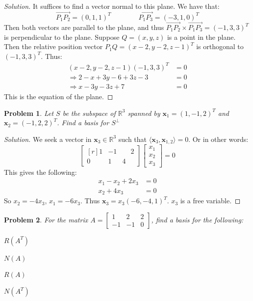 \documentclass[oneside]{book}
\theoremstyle{mystyle}
\newtheorem{problem}{Problem}[section]
\begin{document}
\begin{proof}[Solution]
It suffices to find a vector normal to this plane. We have that:
\begin{equation*}
    \overrightarrow{P_1P_2} = (0,1,1)^T \quad\quad\quad\quad \overrightarrow{P_1P_3} = (-3,1,0)^T
\end{equation*}
Then both vectors are parallel to the plane, and thus $\overrightarrow{P_1P_2}\times \overrightarrow{P_1P_3}=(-1,3,3)^T$ is perpendicular to the plane. Suppose $Q=(x,y,z)$ is a point in the plane. Then the relative position vector $P_1 Q = (x-2,y-2,z-1)^T$ is orthogonal to $(-1,3,3)^T$. Thus:
\begin{align*}
    (x-2,y-2,z-1)(-1,3,3)^T &= 0\\
    \Rightarrow 2-x+3y-6+3z-3 &= 0\\
    \Rightarrow x-3y-3z +7 &= 0   
\end{align*}
This is the equation of the plane.
\end{proof}
\begin{problem}
Let $S$ be the subspace of $\mathbb{R}^3$ spanned by $\mathbf{x}_1 = (1,-1,2)^T$ and $\mathbf{x}_2 = (-1,2,2)^T$. Find a basis for $S^{\perp}$
\end{problem}
\begin{proof}[Solution]
We seek a vector in $\mathbf{x}_3\in\mathbb{R}^3$ such that $\langle \mathbf{x}_3, \mathbf{x}_{1,2}\rangle = 0$. Or in other words:
\begin{equation*}
    \begin{bmatrix*}[r] 1 & -1 & \phantom{-}2 \\ 0 & 1 & 4 \end{bmatrix*}\begin{bmatrix} x_1 \\ x_2 \\ x_3 \end{bmatrix} = 0    
\end{equation*}
This gives the following:
\begin{align*}
x_1 - x_2 + 2x_3 &= 0\\
	x_2 + 4x_3 &= 0
\end{align*}
So $x_2 = -4x_3$, $x_1=-6x_3$. Thus $\mathbf{x}_3 = x_3(-6,-4,1)^T$. $x_3$ is a free variable.
\end{proof}
\begin{problem}
For the matrix $A = \begin{bmatrix} 1 & 2 & 2 \\ -1 & -1 & 0 \end{bmatrix}$, find a basis for the following:
\begin{enumerate}
\begin{multicols}{4}
    \item $R(A^T)$
    \item $N(A)$
    \item $R(A)$
    \item $N(A^T)$
\end{multicols}
\end{enumerate}
\end{problem}
\end{document}
